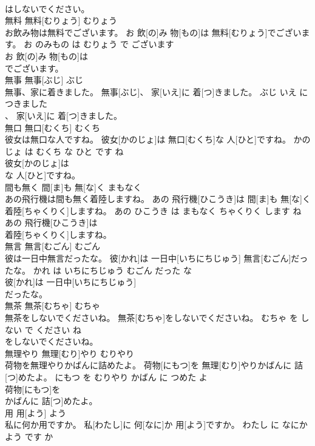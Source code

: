 \documentclass[8pt]{extreport}
\begin{document}
\begin{CJK}{UTF8}{min}
\\	はしないでください。			
\\	無料	無料[むりょう]	むりょう	
\\	お飲み物は無料でございます。	お 飲[の]み 物[もの]は 無料[むりょう]でございます。	お のみもの は むりょう で ございます	
\\	お 飲[の]み 物[もの]は
\\	でございます。			
\\	無事	無事[ぶじ]	ぶじ	
\\	無事、家に着きました。	無事[ぶじ]、 家[いえ]に 着[つ]きました。	ぶじ いえ に つきました	
\\	、 家[いえ]に 着[つ]きました。			
\\	無口	無口[むくち]	むくち	
\\	彼女は無口な人ですね。	彼女[かのじょ]は 無口[むくち]な 人[ひと]ですね。	かのじょ は むくち な ひと です ね	
\\	彼女[かのじょ]は
\\	な 人[ひと]ですね。			
\\	間も無く	間[ま]も 無[な]く	まもなく	
\\	あの飛行機は間も無く着陸しますね。	あの 飛行機[ひこうき]は 間[ま]も 無[な]く 着陸[ちゃくりく]しますね。	あの ひこうき は まもなく ちゃくりく します ね	
\\	あの 飛行機[ひこうき]は
\\	着陸[ちゃくりく]しますね。			
\\	無言	無言[むごん]	むごん	
\\	彼は一日中無言だったな。	彼[かれ]は 一日中[いちにちじゅう] 無言[むごん]だったな。	かれ は いちにちじゅう むごん だった な	
\\	彼[かれ]は 一日中[いちにちじゅう]
\\	だったな。			
\\	無茶	無茶[むちゃ]	むちゃ	
\\	無茶をしないでくださいね。	無茶[むちゃ]をしないでくださいね。	むちゃ を しない で ください ね	
\\	をしないでくださいね。			
\\	無理やり	無理[むり]やり	むりやり	
\\	荷物を無理やりかばんに詰めたよ。	荷物[にもつ]を 無理[むり]やりかばんに 詰[つ]めたよ。	にもつ を むりやり かばん に つめた よ	
\\	荷物[にもつ]を
\\	かばんに 詰[つ]めたよ。			
\\	用	用[よう]	よう	
\\	私に何か用ですか。	私[わたし]に 何[なに]か 用[よう]ですか。	わたし に なにか よう です か	

\end{CJK}
\end{document}

